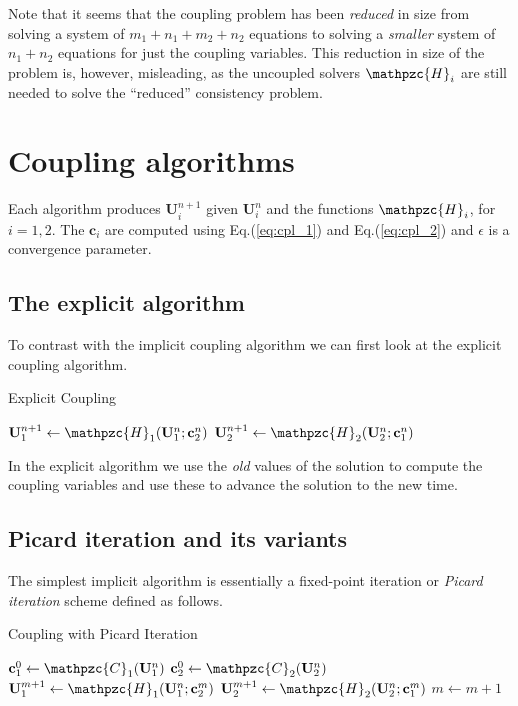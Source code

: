 \documentclass[11pt, reqno]{amsart}
\newcommand{\eqr}[1]{Eq.\thinspace(#1)}
\newcommand{\mvec}[1]{\mathbf{#1}}
\newcommand{\script}[1]{\mathpzc{#1}}
\theoremstyle{definition}
\begin{document}
Note that it seems that the coupling problem has been \emph{reduced}
in size from solving a system of $m_1+n_1+m_2+n_2$ equations to
solving a \emph{smaller} system of $n_1+n_2$ equations for just the
coupling variables. This reduction in size of the problem is, however,
misleading, as the uncoupled solvers $\script{H}_i$ are still needed
to solve the ``reduced'' consistency problem.

\section{Coupling algorithms}

Each algorithm produces $\mvec{U}_i^{n+1}$ given $\mvec{U}_i^{n}$ and
the functions $\script{H}_i$, for $i=1,2$. The $\mvec{c}_i$ are
computed using \eqr{\ref{eq:cpl_1}} and \eqr{\ref{eq:cpl_2}} and
$\epsilon$ is a convergence parameter.

\subsection{The explicit algorithm}

To contrast with the implicit coupling algorithm we can first look at
the explicit coupling algorithm.
\begin{algorithm}
\caption{Explicit Coupling}
\begin{algorithmic}
\STATE $\mvec{U}_1^{n+1} \leftarrow \script{H}_1(\mvec{U}_1^n; \mvec{c}_2^n)$
\STATE $\mvec{U}_2^{n+1} \leftarrow \script{H}_2(\mvec{U}_2^n; \mvec{c}_1^n)$
\end{algorithmic}
\end{algorithm}
In the explicit algorithm we use the \emph{old} values of the solution
to compute the coupling variables and use these to advance the
solution to the new time.

\subsection{Picard iteration and its variants}

The simplest implicit algorithm is essentially a fixed-point iteration
or \emph{Picard iteration} scheme defined as follows.
\begin{algorithm}
\caption{Coupling with Picard Iteration}
\begin{algorithmic}
\STATE $\mvec{c}_1^0 \leftarrow \script{C}_1(\mvec{U}_1^n)$
\STATE $\mvec{c}_2^0 \leftarrow \script{C}_2(\mvec{U}_2^n)$
\WHILE{$|\mvec{c}_1^{m+1}-\mvec{c}_1^m| > \epsilon$ and $|\mvec{c}_2^{m+1}-\mvec{c}_2^m| > \epsilon$}
\STATE $\mvec{U}_1^{m+1} \leftarrow \script{H}_1(\mvec{U}_1^n; \mvec{c}_2^m)$
\STATE $\mvec{U}_2^{m+1} \leftarrow \script{H}_2(\mvec{U}_2^n; \mvec{c}_1^m)$
\STATE $m \leftarrow m+1$
\ENDWHILE
\end{algorithmic}
\end{algorithm}
\end{document}
